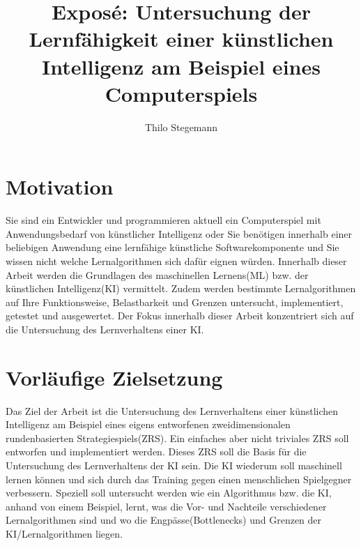 \documentclass[12pt,a4paper]{article}
\author{Thilo Stegemann}
\title{Exposé: Untersuchung der Lernfähigkeit einer künstlichen Intelligenz am Beispiel eines Computerspiels}
\begin{document}
\maketitle

\section*{Motivation}
Sie sind ein Entwickler und programmieren aktuell ein Computerspiel mit Anwendungsbedarf von künstlicher Intelligenz oder Sie benötigen innerhalb einer beliebigen Anwendung eine lernfähige künstliche Softwarekomponente und Sie wissen nicht welche Lernalgorithmen sich dafür eignen würden. Innerhalb dieser Arbeit werden die Grundlagen des maschinellen Lernens(ML) bzw. der künstlichen Intelligenz(KI)  vermittelt. Zudem werden bestimmte Lernalgorithmen auf Ihre Funktionsweise, Belastbarkeit und Grenzen untersucht, implementiert, getestet und ausgewertet. Der Fokus innerhalb dieser Arbeit konzentriert sich auf die Untersuchung des Lernverhaltens einer KI.

\section*{Vorläufige Zielsetzung}
Das Ziel der Arbeit ist die Untersuchung des Lernverhaltens einer künstlichen Intelligenz am Beispiel eines eigens entworfenen zweidimensionalen rundenbasierten Strategiespiels(ZRS). Ein einfaches aber nicht triviales ZRS soll entworfen und implementiert werden. Dieses ZRS soll die Basis für die Untersuchung des Lernverhaltens der KI sein. Die KI wiederum soll maschinell lernen können und sich durch das Training gegen einen menschlichen Spielgegner verbessern. Speziell soll untersucht werden wie ein Algorithmus bzw. die KI, anhand von einem Beispiel, lernt, was die Vor- und Nachteile verschiedener Lernalgorithmen sind und wo die Engpässe(Bottlenecks) und Grenzen der KI/Lernalgorithmen liegen. 
\end{document}
